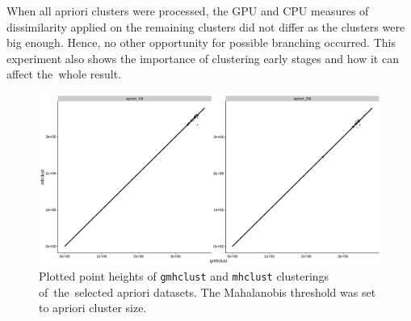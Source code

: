When all apriori clusters were processed, the GPU and CPU measures of dissimilarity applied on the remaining clusters did not differ as the clusters were big enough. Hence, no other opportunity for possible branching occurred. This experiment also shows the importance of clustering early stages and how it can affect the~whole result.

\begin{figure}\centering
	\includegraphics[width=\linewidth]{img/apriori_result}
	\caption{Plotted point heights of \texttt{gmhclust} and \texttt{mhclust} clusterings of~the~selected apriori datasets. The Mahalanobis threshold was set to apriori cluster size.}
	\label{fig04:apriori_result}
\end{figure}

